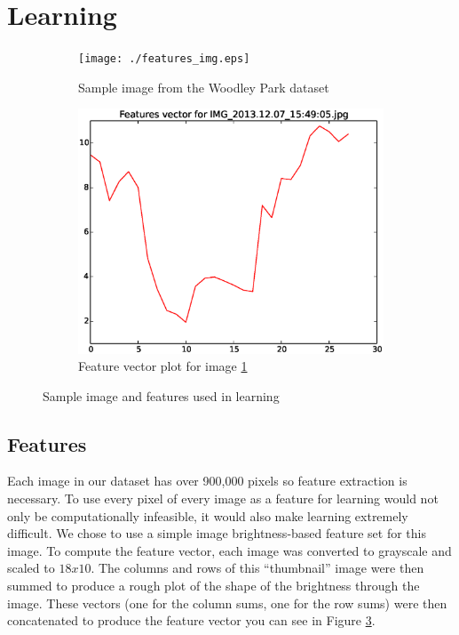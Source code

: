 \documentclass{article}
\begin{document}
\section{Learning}

\begin{figure}[h!]
  \begin{subfigure}[!h]{0.5\textwidth}
    \centering
    \texttt{[image: ./features\_img.eps]}
    \caption{Sample image from the Woodley Park dataset}
    \label{fig:woodley_sample}
  \end{subfigure}
  \begin{subfigure}[!h]{0.5\textwidth}
    \centering
    \includegraphics[width=\textwidth]{./Brightness_data.eps}
    \caption{Feature vector plot for image \ref{fig:woodley_sample}}
    \label{fig:woodley_features}
  \end{subfigure}
  \caption{Sample image and features used in learning}
\end{figure}

\subsection{Features}
Each image in our dataset has over 900,000 pixels so feature extraction is necessary. To use every pixel of every image as a feature for learning would not only be computationally infeasible, it would also make learning extremely difficult. We chose to use a simple image brightness-based feature set for this image. To compute the feature vector, each image was converted to grayscale and scaled to $18x10$. The columns and rows of this ``thumbnail'' image were then summed to produce a rough plot of the shape of the brightness through the image. These vectors (one for the column sums, one for the row sums) were then concatenated to produce the feature vector you can see in Figure \ref{fig:woodley_features}.
\end{document}

